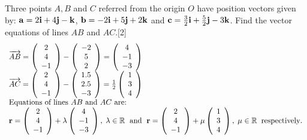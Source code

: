 \documentclass[12pt, a4 paper]{article}
\begin{document}
\begin{outline}[enumerate]
					\1 Three points $A, B$ and $C$ referred from the origin $O$ have position vectors given by:
					${\bf{a}} = 2{\bf{i}} + 4{\bf{j}} - {\bf{k}}$, ${\bf{b}} =  - 2{\bf{i}} + 5{\bf{j}} + 2{\bf{k}}$ and ${\bf{c}} = \frac{3}{2}{\bf{i}} + \frac{5}{2}{\bf{j}} - 3{\bf{k}}$.
					\2 Find the vector equations of lines $AB$ and $AC$.\hfill[2]
					\color{blue}
					\[\begin{array}{l}\overrightarrow {AB}  = \left( {\begin{array}{*{20}{c}}2\\4\\{ - 1}\end{array}} \right) - \left( {\begin{array}{*{20}{c}}{ - 2}\\5\\2\end{array}} \right) = \left( {\begin{array}{*{20}{c}}4\\{ - 1}\\{ - 3}\end{array}} \right)\\\overrightarrow {AC}  = \left( {\begin{array}{*{20}{c}}2\\4\\{ - 1}\end{array}} \right) - \left( {\begin{array}{*{20}{c}}{1.5}\\{2.5}\\{ - 3}\end{array}} \right) = \frac{1}{2}\left( {\begin{array}{*{20}{c}}1\\3\\4\end{array}} \right)\\{\textrm{Equations of lines }}AB{\textrm{ and }}AC{\textrm{ are:}}\\{\bf{r}} = \left( {\begin{array}{*{20}{c}}2\\4\\{ - 1}\end{array}} \right) + \lambda \left( {\begin{array}{*{20}{c}}4\\{ - 1}\\{ - 3}\end{array}} \right),\;\lambda  \in \mathbb{R}{\textrm{ }}\;{\textrm{and}}\;{\textrm{  }}{\bf{r}} = \left( {\begin{array}{*{20}{c}}2\\4\\{ - 1}\end{array}} \right) + \mu \left( {\begin{array}{*{20}{c}}1\\3\\4\end{array}} \right),\;\mu  \in \mathbb{R}\;\;{\textrm{respectively}}{\textrm{.}}\end{array}\]
					\color{black}


\end{outline}
\end{document}
